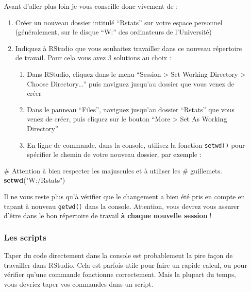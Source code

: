 \documentclass[a4paperpaper,]{article}
\newenvironment{Shaded}{\begin{snugshade}}{\end{snugshade}}
\newcommand{\CommentTok}[1]{\textcolor[rgb]{0.54,0.53,0.53}{#1}}
\newcommand{\KeywordTok}[1]{\textcolor[rgb]{0.12,0.11,0.11}{\textbf{#1}}}
\newcommand{\NormalTok}[1]{\textcolor[rgb]{0.12,0.11,0.11}{#1}}
\newcommand{\StringTok}[1]{\textcolor[rgb]{0.75,0.01,0.01}{#1}}
\providecommand{\tightlist}{%
  \setlength{\itemsep}{0pt}\setlength{\parskip}{0pt}}
\begin{document}
Avant d'aller plus loin je vous conseille donc vivement de :

\begin{enumerate}
\def\labelenumi{\arabic{enumi}.}
\tightlist
\item
  Créer un nouveau dossier intitulé ``Rstats'' sur votre espace personnel (généralement, sur le disque ``W:'' des ordinateurs de l'Université)
\item
  Indiquez à RStudio que vous souhaitez travailler dans ce nouveau répertoire de travail. Pour cela vous avez 3 solutions au choix :

  \begin{enumerate}
  \def\labelenumii{\arabic{enumii}.}
  \tightlist
  \item
    Dans RStudio, cliquez dans le menu ``Session \textgreater{} Set Working Directory \textgreater{} Choose Directory\ldots{}'' puis naviguez jusqu'au dossier que vous venez de créer
  \item
    Dans le panneau ``Files'', naviguez jusqu'au dossier ``Rstats'' que vous venez de créer, puis cliquez sur le bouton ``More \textgreater{} Set As Working Directory''
  \item
    En ligne de commande, dans la console, utilisez la fonction \texttt{setwd()} pour spécifier le chemin de votre nouveau dossier, par exemple :
  \end{enumerate}
\end{enumerate}

\begin{Shaded}
\begin{Highlighting}[]
\CommentTok{# Attention à bien respecter les majuscules et à utiliser les}
\CommentTok{# guillemets.}
\KeywordTok{setwd}\NormalTok{(}\StringTok{"W:/Rstats"}\NormalTok{)}
\end{Highlighting}
\end{Shaded}

Il ne vous reste plus qu'à vérifier que le changement a bien été pris en compte en tapant à nouveau \texttt{getwd()} dans la console. Attention, vous devrez vous assurer d'être dans le bon répertoire de travail \textbf{à chaque nouvelle session} !

\hypertarget{les-scripts}{%
\subsubsection{Les scripts}\label{les-scripts}}

Taper du code directement dans la console est probablement la pire façon de travailler dans RStudio. Cela est parfois utile pour faire un rapide calcul, ou pour vérifier qu'une commande fonctionne correctement. Mais la plupart du temps, vous devriez taper vos commandes dans un script.
\end{document}
